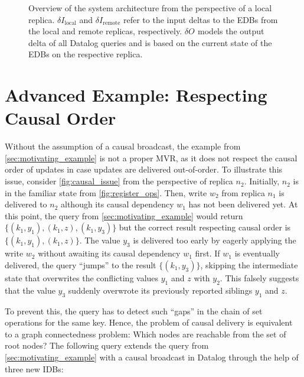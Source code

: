 \documentclass{article}
\newcommand{\deltaI}[1]{\(\delta I_{\text{#1}}\)}
\newcommand{\deltaO}[1][]{\(\delta O_{\text{#1}}\)}
\begin{document}
\begin{figure*}

	\caption{
		Overview of the system architecture from the perspective of a local
		replica.
		\deltaI{local} and \deltaI{remote} refer to the input deltas to
		the EDBs from the local and remote replicas, respectively.
		\deltaO{} models the output delta of all Datalog queries and is based on
		the current state of the EDBs on the respective replica.
	}\label{fig:system_overview}
\end{figure*}

\section{Advanced Example: Respecting Causal Order}
\label{sec:advanced_example}

Without the assumption of a causal broadcast,
the example from \autoref{sec:motivating_example} is not a proper MVR,
as it does not respect the causal order of updates in case updates are delivered
out-of-order.
To illustrate this issue, consider \autoref{fig:causal_issue} from the
perspective of replica \(n_2\).
Initially, \(n_2\) is in the familiar state from \autoref{fig:register_ops}.
Then, write \(w_2\) from replica \(n_1\) is delivered to \(n_2\) although its
causal dependency \(w_1\) has not been delivered yet.
At this point, the query from \autoref{sec:motivating_example} would return
\(\{ (k_1, y_1), (k_1, z), (k_1, y_3)\} \)
but the correct result respecting causal order is
\(\{ (k_1, y_1), (k_1, z) \}\).
The value \(y_3\) is delivered too early by eagerly applying the write \(w_2\)
without awaiting its causal dependency \(w_1\) first.
If \(w_1\) is eventually delivered, the query ``jumps'' to the result
\( \{ (k_1, y_3) \} \), skipping the intermediate state
that overwrites the conflicting values \(y_1\) and \(z\) with \(y_2\).
This falsely suggests that the value \(y_3\) suddenly overwrote its previously
reported siblings \(y_1\) and \(z\).

To prevent this, the query has to detect such ``gaps'' in the chain of set
operations for the same key.
Hence, the problem of causal delivery is equivalent to a graph connectedness
problem: Which nodes are reachable from the set of root nodes?
The following query extends the query from \autoref{sec:motivating_example}
with a causal broadcast in Datalog through the help of three new IDBs:
\end{document}
